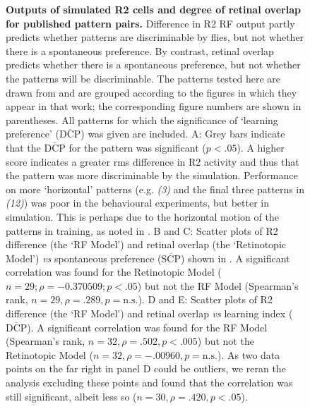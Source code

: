 \begin{figure}[htp]
	\caption{
		{\bf Outputs of simulated R2 cells and degree of retinal overlap for published pattern pairs.}
		Difference in R2 \ac{RF} output partly predicts whether patterns are discriminable by flies, but not whether there is a spontaneous preference.
		By contrast, retinal overlap predicts whether there is a spontaneous preference, but not whether the patterns will be discriminable.
		The patterns tested here are drawn from \protect\cite{Ernst1999} and are grouped according to the figures in which they appear in that work; the corresponding figure numbers are shown in parentheses.
		All patterns for which the significance of `learning preference' ($\overline{\mathrm{DCP}}$) was given are included.
		A: Grey bars indicate that the $\overline{\mathrm{DCP}}$ for the pattern was significant ($p<.05$).
		A higher score indicates a greater \ac{rms} difference in R2 activity and thus that the pattern was more discriminable by the simulation.
		Performance on more `horizontal' patterns (e.g. \emph{(3)} and the final three patterns in \emph{(12)}) was poor in the behavioural experiments, but better in simulation.
		This is perhaps due to the horizontal motion of the patterns in training, as noted in \protect\cite{Ernst1999}.
		B and C: Scatter plots of R2 difference (the `\ac{RF} Model') and retinal overlap (the `Retinotopic Model') \emph{vs} spontaneous preference ($\overline{\mathrm{SCP}}$) shown in \protect\cite{Ernst1999}.
		A significant correlation was found for the Retinotopic Model ($n = 29; \rho = -0.370509; p < .05$) but not the \ac{RF} Model (Spearman's rank, $n=29, \rho=.289, p=\mathrm{n.s.}$).
		D and E: Scatter plots of R2 difference (the `\ac{RF} Model') and retinal overlap \emph{vs} learning index ($\overline{\mathrm{DCP}}$).
		A significant correlation was found for the \ac{RF} Model (Spearman's rank, $n=32, \rho=.502, p < .005$) but not the Retinotopic Model ($n=32, \rho=-.00960, p=\mathrm{n.s.}$).
		As two data points on the far right in panel D could be outliers, we reran the analysis excluding these points and found that the correlation was still significant, albeit less so ($n=30, \rho=.420, p < .05$).
		}
	\label{fig:pattern}
\end{figure}

